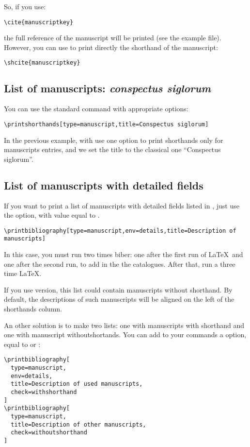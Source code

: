 \documentclass{ltxdockit}[2011/03/25]
\begin{document}
So, if you use:
\begin{verbatim}
\cite{manuscriptkey}
\end{verbatim}

the full reference of the manuscript will be printed (see the example file). However, you can use  to print directly the shorthand of the manuscript:

\begin{verbatim}
\shcite{manuscriptkey}
\end{verbatim}

\subsection{List of manuscripts: \emph{conspectus siglorum}}

You can use the standard command  with appropriate options:

\begin{verbatim}
\printshorthands[type=manuscript,title=Conspectus siglorum]
\end{verbatim}

In the previous example, with use one option to print shorthands only for manuscripts entries, and we set the title to the classical one \enquote{Conspectus siglorum}.

\subsection{List of manuscripts with detailed fields}

If you want to print a list of manuscripts with detailed fields listed in , just use the  option, with value equal to
.

\begin{verbatim}
\printbibliography[type=manuscript,env=details,title=Description of manuscripts]
\end{verbatim}

In this case, you must run two times biber: one after the first run of \LaTeX\ and one after the second run, to add in the  the catalogues. After that, run a three time \LaTeX.

If you use  version, this list could contain manuscripts without shorthand. By default, the descriptions of such manuscripts will be aligned on the left of the shorthands column. 

\label{bibcheck}An other solution is to make two lists: one with manuscripts with shorthand and one with manuscript withoutshortands. You can add to your  commands a  option, equal to  or :
\begin{verbatim}
\printbibliography[
  type=manuscript,
  env=details,
  title=Description of used manuscripts,
  check=withshorthand
]
\printbibliography[
  type=manuscript,
  title=Description of other manuscripts,
  check=withoutshorthand
]
\end{verbatim}
\end{document}

